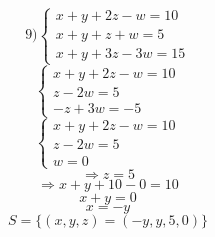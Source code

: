 \documentclass{article}
\begin{document}
\[
\text{9)}
\begin{cases}
x + y + 2z - w = 10 \\
x + y + z + w = 5 \\
x + y + 3z - 3w = 15
\end{cases}
\]
\[
\begin{cases}
x + y + 2z - w = 10 \\
z - 2w = 5 \\
-z + 3w = -5
\end{cases}
\]
\[
\begin{cases}
x + y + 2z - w = 10 \\
z - 2w = 5 \\
w = 0
\end{cases}
\]
\[
\Rightarrow z = 5
\]
\[
\Rightarrow x + y + 10 - 0 = 10
\]
\[
x + y = 0
\]
\[
x = -y
\]
\[
S = \{(x, y, z) = (-y, y, 5, 0)\}
\]
\end{document}
